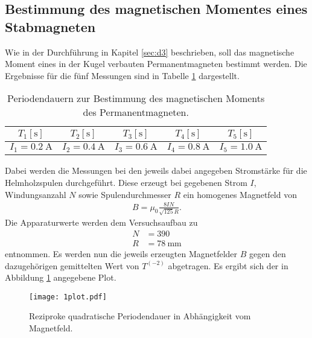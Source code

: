\subsection{Bestimmung des magnetischen Momentes eines Stabmagneten}
Wie in der Durchführung in Kapitel \ref{sec:d3} beschrieben, soll das magnetische Moment eines in der Kugel verbauten Permanentmagneten bestimmt werden.
Die Ergebnisse für die fünf Messungen sind in Tabelle \ref{tab:4} dargestellt.
\begin{table}[H]
  \centering
  \caption{Periodendauern zur Bestimmung des magnetischen Moments des Permanentmagneten.}
  \label{tab:4}
  \begin{tabular}{c c c c c}
    \toprule
    {$T_{1} [\si{\second}]$} & {$T_{2} [\si{\second}]$} & {$T_{3} [\si{\second}]$} & {$T_{4} [\si{\second}]$} & {$T_{5} [\si{\second}]$}\\
    \midrule
    
    \midrule
    {$I_1 = \SI{0.2}{\ampere}$} & {$I_2 = \SI{0.4}{\ampere}$} & {$I_3 = \SI{0.6}{\ampere}$} & {$I_4 = \SI{0.8}{\ampere}$} & {$I_5 = \SI{1.0}{\ampere}$} \\
    \bottomrule
  \end{tabular}
\end{table}
Dabei werden die Messungen bei den jeweils dabei angegeben Stromstärke für die Helmholzspulen durchgeführt.
Diese erzeugt bei gegebenen Strom $I$, Windungsanzahl $N$ sowie Spulendurchmesser $R$ ein homogenes Magnetfeld von
\begin{align}
  B = \mu_0 \frac{8 I N}{\sqrt{125} R}.
\end{align}
Die Apparaturwerte werden dem Versuchsaufbau zu
\begin{align*}
  N &= 390 \\
  R &= \SI{78}{\milli\metre}
\end{align*}
entnommen.
Es werden nun die jeweils erzeugten Magnetfelder $B$ gegen den dazugehörigen gemittelten Wert von $T^(-2)$ abgetragen.
Es ergibt sich der in Abbildung \ref{fig:a1} angegebene Plot.

\begin{figure}[H]
  \centering
  \texttt{[image: 1plot.pdf]}
  \caption{Reziproke quadratische Periodendauer in Abhängigkeit vom Magnetfeld.}
  \label{fig:a1}
\end{figure}

